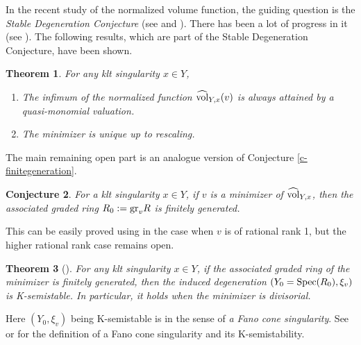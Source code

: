 \documentclass[12pt,reqno]{amsart}%
\newtheorem{thm}{Theorem}[section]
\newtheorem{conj}[thm]{Conjecture}
\theoremstyle{definition}
\theoremstyle{remark}
\newcommand{\Val}{{\rm Val}}
\newcommand{\hvol}{\widehat{\rm vol}}
\begin{document}
\begin{subappendices}
In the recent study of the normalized volume function, the  guiding question is the {\it Stable Degeneration Conjecture} (see \cite[Conjecture 7.1]{Li18} and \cite[Conjecture 1.2]{LX18}). There has been a lot of progress in it (see \cite{LLX18}). The following results, which are part of the Stable Degeneration Conjecture, have been shown.
 \begin{thm}\label{t-singularityvolume}
 For any klt singularity $x\in Y$,
 \begin{enumerate}
 \item \cites{Blu18,Xu19} The infimum of the normalized function $ \hvol_{Y,x}(v)$ is always attained by a quasi-monomial valuation.
 \item \cite{XZ20} The minimizer is unique up to rescaling.
 \end{enumerate} 
 \end{thm}
 
 The main remaining open part is an analogue version of Conjecture \ref{c-finitegeneration}.
 \begin{conj}\label{c-localfinite}
 For a klt singularity $x\in Y$, if $v$ is a minimizer of $\hvol_{Y,x}$, then the associated graded ring $R_0:={\rm gr}_vR$ is finitely generated. 
 \end{conj}
 This can be easily proved using \cite{BCHM10} in the case when $v$ is of rational rank 1, but the higher rational rank case remains open. 
 
  \begin{thm}[{\cites{Li17, LX20, LX18}}]\label{t-singularityvolume}
 For any klt singularity $x\in Y$, if the associated graded ring of the minimizer is finitely generated, then the induced degeneration $(Y_0={\rm Spec}(R_0),  \xi_v)$ is K-semistable.  In particular, it holds when the minimizer is divisorial.
 \end{thm}
Here $(Y_0,\xi_v)$ being K-semistable is in the sense of  {\it a Fano cone singularity}. See \cite{CS18} or \cite[Section 2.5]{LLX18} for the definition of a Fano cone singularity and its K-semistability. 

 

\end{subappendices}
\end{document}
